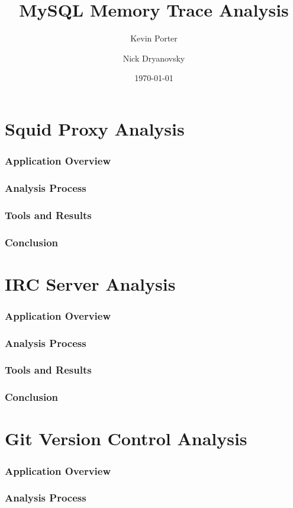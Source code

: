 \documentclass[11pt,a4paper, titlepage, oneside]{article}
\begin{document}
\title{MySQL Memory Trace Analysis}
\author{Kevin Porter \and Nick Dryanovsky}
\date{\today}
\maketitle

\setcounter{section}{-1}
\part{Squid Proxy Analysis}
\section{Application Overview}
\section{Analysis Process}
\section{Tools and Results}
\section{Conclusion}
\part{IRC Server Analysis}
\section{Application Overview}
\section{Analysis Process}
\section{Tools and Results}
\section{Conclusion}
\part{Git Version Control Analysis}
\section{Application Overview}
\section{Analysis Process}
\end{document}
